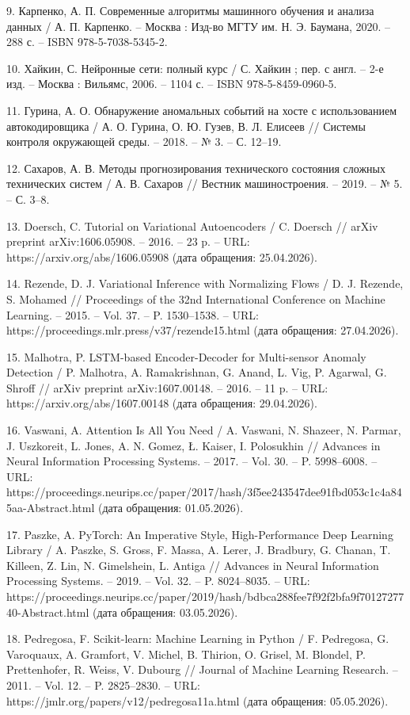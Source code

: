\documentclass[14pt, a4paper, oneside]{extreport}
\begin{document}
9. Карпенко, А. П. Современные алгоритмы машинного обучения и анализа данных / А. П. Карпенко. – Москва : Изд-во МГТУ им. Н. Э. Баумана, 2020. – 288 с. – ISBN 978-5-7038-5345-2.

10. Хайкин, С. Нейронные сети: полный курс / С. Хайкин ; пер. с англ. – 2-е изд. – Москва : Вильямс, 2006. – 1104 с. – ISBN 978-5-8459-0960-5.

11. Гурина, А. О. Обнаружение аномальных событий на хосте с использованием автокодировщика / А. О. Гурина, О. Ю. Гузев, В. Л. Елисеев // Системы контроля окружающей среды. – 2018. – № 3. – С. 12–19.

12. Сахаров, А. В. Методы прогнозирования технического состояния сложных технических систем / А. В. Сахаров // Вестник машиностроения. – 2019. – № 5. – С. 3–8.

13. Doersch, C. Tutorial on Variational Autoencoders / C. Doersch // arXiv preprint arXiv:1606.05908. – 2016. – 23 p. – URL: https://arxiv.org/abs/1606.05908 (дата обращения: 25.04.2026).

14. Rezende, D. J. Variational Inference with Normalizing Flows / D. J. Rezende, S. Mohamed // Proceedings of the 32nd International Conference on Machine Learning. – 2015. – Vol. 37. – P. 1530–1538. – URL: https://proceedings.mlr.press/v37/rezende15.html (дата обращения: 27.04.2026).

15. Malhotra, P. LSTM-based Encoder-Decoder for Multi-sensor Anomaly Detection / P. Malhotra, A. Ramakrishnan, G. Anand, L. Vig, P. Agarwal, G. Shroff // arXiv preprint arXiv:1607.00148. – 2016. – 11 p. – URL: https://arxiv.org/abs/1607.00148 (дата обращения: 29.04.2026).

16. Vaswani, A. Attention Is All You Need / A. Vaswani, N. Shazeer, N. Parmar, J. Uszkoreit, L. Jones, A. N. Gomez, Ł. Kaiser, I. Polosukhin // Advances in Neural Information Processing Systems. – 2017. – Vol. 30. – P. 5998–6008. – URL: https://proceedings.neurips.cc/paper/2017/hash/3f5ee243547dee91fbd053c1c4a845aa-Abstract.html (дата обращения: 01.05.2026).

17. Paszke, A. PyTorch: An Imperative Style, High-Performance Deep Learning Library / A. Paszke, S. Gross, F. Massa, A. Lerer, J. Bradbury, G. Chanan, T. Killeen, Z. Lin, N. Gimelshein, L. Antiga // Advances in Neural Information Processing Systems. – 2019. – Vol. 32. – P. 8024–8035. – URL: https://proceedings.neurips.cc/paper/2019/hash/bdbca288fee7f92f2bfa9f7012727740-Abstract.html (дата обращения: 03.05.2026).

18. Pedregosa, F. Scikit-learn: Machine Learning in Python / F. Pedregosa, G. Varoquaux, A. Gramfort, V. Michel, B. Thirion, O. Grisel, M. Blondel, P. Prettenhofer, R. Weiss, V. Dubourg // Journal of Machine Learning Research. – 2011. – Vol. 12. – P. 2825–2830. – URL: https://jmlr.org/papers/v12/pedregosa11a.html (дата обращения: 05.05.2026).
\end{document}
